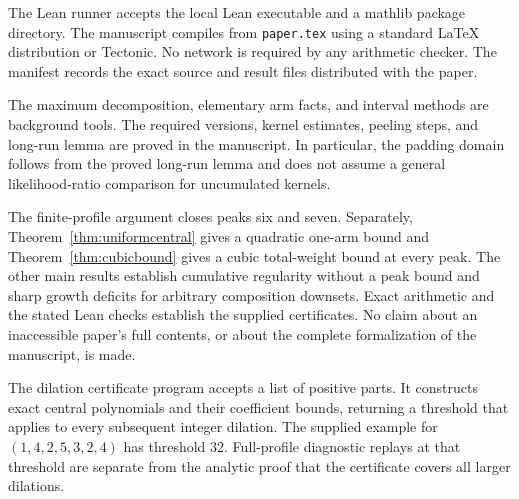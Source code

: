 The Lean runner accepts the local Lean executable and a mathlib package directory. The manuscript compiles from \texttt{paper.tex} using a standard LaTeX distribution or Tectonic. No network is required by any arithmetic checker. The manifest records the exact source and result files distributed with the paper.

The maximum decomposition, elementary arm facts, and interval methods
are background tools. The required versions, kernel estimates, peeling
steps, and long-run lemma are proved in the manuscript. In particular,
the padding domain follows from the proved long-run lemma and does not
assume a general likelihood-ratio comparison for uncumulated kernels.

The finite-profile argument closes peaks six and seven. Separately,
Theorem~\ref{thm:uniformcentral} gives a quadratic one-arm bound and
Theorem~\ref{thm:cubicbound} gives a cubic total-weight bound at every
peak. The other main results establish cumulative regularity without a
peak bound and sharp growth deficits for arbitrary composition
downsets. Exact arithmetic and the stated Lean checks establish the
supplied certificates. No claim about an inaccessible paper's full
contents, or about the complete formalization of the manuscript, is
made.

The dilation certificate program accepts a list of positive parts.
It constructs exact central polynomials and their coefficient bounds,
returning a threshold that applies to every subsequent integer
dilation. The supplied example for $(1,4,2,5,3,2,4)$ has threshold 32.
Full-profile diagnostic replays at that threshold are separate from
the analytic proof that the certificate covers all larger dilations.
